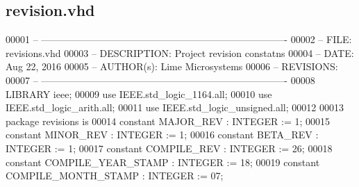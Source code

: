 \subsection{revision.\+vhd}
\label{revision_8vhd_source}

\begin{DoxyCode}
00001 \textcolor{keyword}{-- ---------------------------------------------------------------------------- }
00002 \textcolor{keyword}{-- FILE:    revisions.vhd}
00003 \textcolor{keyword}{-- DESCRIPTION: Project revision constatns}
00004 \textcolor{keyword}{-- DATE:    Aug 22, 2016}
00005 \textcolor{keyword}{-- AUTHOR(s):   Lime Microsystems}
00006 \textcolor{keyword}{-- REVISIONS:}
00007 \textcolor{keyword}{-- ---------------------------------------------------------------------------- }
00008 \textcolor{vhdlkeyword}{LIBRARY }\textcolor{keywordflow}{ieee};
00009 \textcolor{vhdlkeyword}{use }IEEE.std\_logic\_1164.\textcolor{keywordflow}{all};
00010 \textcolor{vhdlkeyword}{use }IEEE.std\_logic\_arith.\textcolor{keywordflow}{all};
00011 \textcolor{vhdlkeyword}{use }IEEE.std\_logic\_unsigned.\textcolor{keywordflow}{all};
00012 
00013 \textcolor{keywordflow}{package }revisions \textcolor{keywordflow}{is}
00014     \textcolor{keywordflow}{constant} \textcolor{vhdlchar}{MAJOR_REV} \textcolor{vhdlchar}{:} \textcolor{comment}{INTEGER} \textcolor{vhdlchar}{:=} \textcolor{vhdllogic}{}\textcolor{vhdllogic}{1};
00015     \textcolor{keywordflow}{constant} \textcolor{vhdlchar}{MINOR_REV} \textcolor{vhdlchar}{:} \textcolor{comment}{INTEGER} \textcolor{vhdlchar}{:=} \textcolor{vhdllogic}{}\textcolor{vhdllogic}{1};
00016     \textcolor{keywordflow}{constant} \textcolor{vhdlchar}{BETA_REV} \textcolor{vhdlchar}{:} \textcolor{comment}{INTEGER} \textcolor{vhdlchar}{:=} \textcolor{vhdllogic}{}\textcolor{vhdllogic}{1};
00017     \textcolor{keywordflow}{constant} \textcolor{vhdlchar}{COMPILE_REV} \textcolor{vhdlchar}{:} \textcolor{comment}{INTEGER} \textcolor{vhdlchar}{:=} \textcolor{vhdllogic}{}\textcolor{vhdllogic}{26};
00018     \textcolor{keywordflow}{constant} \textcolor{vhdlchar}{COMPILE_YEAR_STAMP} \textcolor{vhdlchar}{:} \textcolor{comment}{INTEGER} \textcolor{vhdlchar}{:=} \textcolor{vhdllogic}{}\textcolor{vhdllogic}{18};
00019     \textcolor{keywordflow}{constant} \textcolor{vhdlchar}{COMPILE_MONTH_STAMP} \textcolor{vhdlchar}{:} \textcolor{comment}{INTEGER} \textcolor{vhdlchar}{:=} \textcolor{vhdllogic}{}\textcolor{vhdllogic}{07};

\end{DoxyCode}
